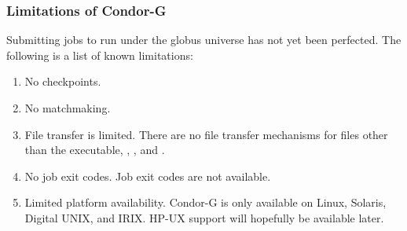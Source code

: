 \subsubsection{\label{sec:Condor-G-Limits}Limitations of Condor-G}
Submitting jobs to run under the globus universe has not yet
been perfected.
The following is a list of known limitations:

\begin{enumerate}
\item{No checkpoints.}
\item{No matchmaking.}
\item{File transfer is limited.}
There are no file transfer mechanisms for files other
than the executable, , , and .
\item{No job exit codes.}
Job exit codes are not available.
\item{Limited platform availability.}
Condor-G is only available on Linux, Solaris,
Digital UNIX, and IRIX.
HP-UX support will hopefully be available later.
\end{enumerate}
